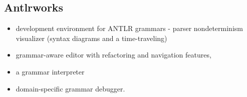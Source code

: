 	\subsection{Antlrworks}

\begin{itemize}
	\item development environment for ANTLR grammars - parser nondeterminism visualizer (syntax diagrams and a time-traveling)
	\item grammar-aware editor with refactoring and navigation features, 
	\item a grammar interpreter
	\item domain-specific grammar debugger. 
\end{itemize}
	





